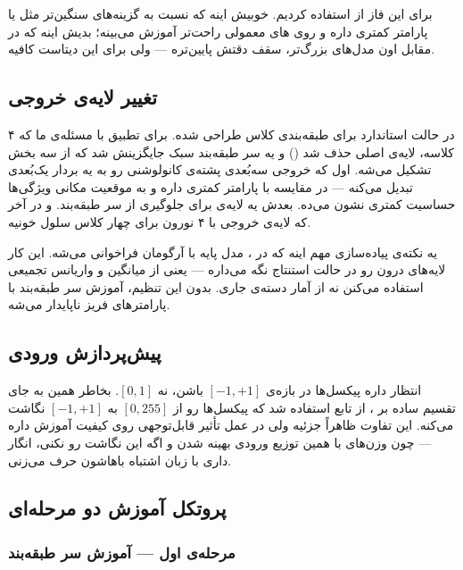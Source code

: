 \documentclass[a4paper,11pt]{article}
\begin{document}
برای این فاز از  استفاده کردیم. خوبیش اینه که نسبت به گزینه‌های سنگین‌تر مثل  یا  پارامتر کمتری داره و روی های معمولی راحت‌تر آموزش می‌بینه؛ بدیش اینه که در مقابل اون مدل‌های بزرگ‌تر، سقف دقتش پایین‌تره — ولی برای این دیتاست کافیه.

\subsection{تغییر لایه‌ی خروجی}

 در حالت استاندارد برای طبقه‌بندی  کلاس  طراحی شده. برای تطبیق با مسئله‌ی ما که ۴ کلاسه، لایه‌ی  اصلی حذف شد () و یه سر طبقه‌بند سبک جایگزینش شد که از سه بخش تشکیل می‌شه. اول  که خروجی سه‌بُعدی پشته‌ی کانولوشنی رو به یه بردار یک‌بُعدی تبدیل می‌کنه — در مقایسه با  پارامتر کمتری داره و به موقعیت مکانی ویژگی‌ها حساسیت کمتری نشون می‌ده. بعدش یه لایه‌ی  برای جلوگیری از  سر طبقه‌بند. و در آخر  که لایه‌ی خروجی با ۴ نورون برای چهار کلاس سلول خونیه.

یه نکته‌ی پیاده‌سازی مهم اینه که در ، مدل پایه با آرگومان  فراخوانی می‌شه. این کار لایه‌های  درون  رو در حالت استنتاج نگه می‌داره — یعنی از میانگین و واریانس تجمیعی استفاده می‌کنن نه از آمار دسته‌ی جاری. بدون این تنظیم، آموزش سر طبقه‌بند با پارامترهای  فریز ناپایدار می‌شه.

\subsection{پیش‌پردازش ورودی}

 انتظار داره پیکسل‌ها در بازه‌ی $[-1, +1]$ باشن، نه $[0, 1]$. بخاطر همین به جای تقسیم ساده بر ، از تابع  استفاده شد که پیکسل‌ها رو از $[0, 255]$ به $[-1, +1]$ نگاشت می‌کنه. این تفاوت ظاهراً جزئیه ولی در عمل تأثیر قابل‌توجهی روی کیفیت آموزش داره — چون وزن‌های  با همین توزیع ورودی بهینه شدن و اگه این نگاشت رو نکنی، انگار داری با زبان اشتباه باهاشون حرف می‌زنی.

\subsection{پروتکل آموزش دو مرحله‌ای}

\subsubsection{مرحله‌ی اول — آموزش سر طبقه‌بند}
\end{document}
